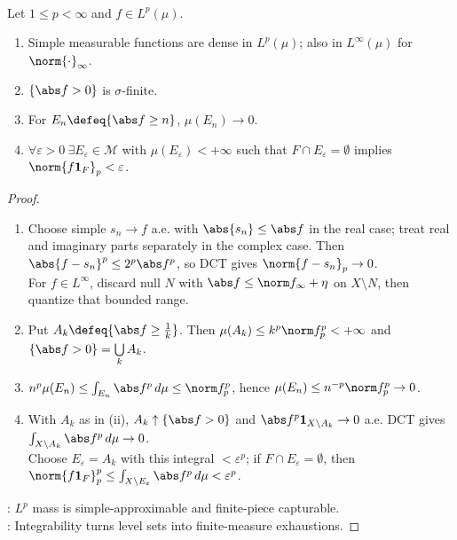 \begin{proposition} \label{prop:simple-density-support-and-tails-lp} \\
Let $1\leq p<\infty$ and $f\in L^p(\mu)$.
\begin{enumerate}[label=(\roman*)]
\setlength{\itemsep}{0pt}
\item Simple measurable functions are dense in $L^p(\mu)$; also in $L^\infty(\mu)$ for $\norm{\cdot}_\infty$.
\item $\{\abs f>0\}$ is $\sigma$-finite.
\item For $E_n\defeq\{\abs f\geq n\}$, $\mu(E_n)\to0$.
\item $\forall\varepsilon>0\ \exists E_\varepsilon\in\mathcal M$ with $\mu(E_\varepsilon)<+\infty$ such that $F\cap E_\varepsilon=\emptyset$ implies $\norm{f\mathbf 1_F}_p<\varepsilon$.
\end{enumerate}
\begin{proof}
\begin{enumerate}[label=(\roman*)]
\setlength{\itemsep}{0pt}
\item Choose simple $s_n\to f$ a.e. with $\abs{s_n}\leq\abs f$ in the real case; treat real and imaginary parts separately in the complex case. Then $\abs{f-s_n}^p\leq2^p\abs f^p$, so DCT gives $\norm{f-s_n}_p\to0$.\\
For $f\in L^\infty$, discard null $N$ with $\abs f\leq\norm f_\infty+\eta$ on $X\setminus N$, then quantize that bounded range.
\item Put $A_k\defeq\{\abs f\geq\frac{1}{k}\}$. Then $\mu(A_k)\leq k^p\norm f_p^p<+\infty$ and $\{\abs f>0\}=\bigcup\limits_kA_k$.
\item $n^p\mu(E_n)\leq\int_{E_n}\abs f^p\,d\mu\leq\norm f_p^p$, hence $\mu(E_n)\leq n^{-p}\norm f_p^p\to0$.
\item With $A_k$ as in (ii), $A_k\uparrow\{\abs f>0\}$ and $\abs f^p\mathbf 1_{X\setminus A_k}\to0$ a.e. DCT gives $\int_{X\setminus A_k}\abs f^p\,d\mu\to0$.\\
Choose $E_\varepsilon=A_k$ with this integral $<\varepsilon^p$; if $F\cap E_\varepsilon=\emptyset$, then $\norm{f\mathbf 1_F}_p^p\leq\int_{X\setminus E_\varepsilon}\abs f^p\,d\mu<\varepsilon^p$.
\end{enumerate}
: $L^p$ mass is simple-approximable and finite-piece capturable.\\
: Integrability turns level sets into finite-measure exhaustions.
\end{proof}
\end{proposition}

